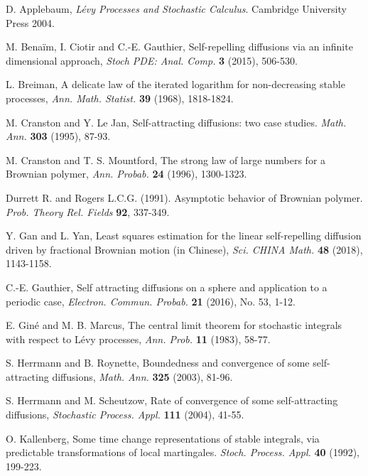 \documentclass[11pt]{amsart}
\theoremstyle{plain}
\numberwithin{equation}{section}
\begin{document}
\begin{thebibliography}{0}

  D. Applebaum, {\it L\'evy Processes and Stochastic Calculus}. Cambridge University Press 2004.
  
  M. Bena\"im, I. Ciotir and C.-E. Gauthier, Self-repelling diffusions via an infinite dimensional approach, {\em Stoch PDE: Anal. Comp.} {\bf 3} (2015), 506-530.
  
  L. Breiman, A delicate law of the iterated logarithm for non-decreasing stable processes, {\it Ann. Math. Statist.} {\bf 39} (1968), 1818-1824.
  
  M. Cranston and Y. Le Jan, Self-attracting diffusions: two case studies. {\it Math. Ann.} {\bf 303} (1995), 87-93.
  
  M. Cranston and T. S. Mountford, The strong law of large numbers for a Brownian polymer, {\it Ann. Probab.} {\bf 24} (1996), 1300-1323.
  
  Durrett R. and Rogers L.C.G. (1991).  Asymptotic behavior of Brownian polymer. {\it Prob. Theory Rel. Fields} {\bf 92}, 337-349.
  
  Y. Gan and L. Yan, Least squares estimation for the linear self-repelling diffusion driven by fractional Brownian motion (in Chinese), {\em Sci. CHINA Math.} {\bf 48} (2018), 1143-1158.
  
  C.-E. Gauthier, Self attracting diffusions on a sphere and application to a periodic case, {\em Electron. Commun. Probab.} {\bf 21} (2016), No. 53, 1-12.
  
  E. Gin\'e and M. B. Marcus, The central limit theorem for stochastic integrals with respect to L\'evy processes, {\it Ann. Prob.} {\bf 11} (1983), 58-77.
  
  S. Herrmann and B. Roynette, Boundedness and convergence of some self-attracting diffusions, {\it Math. Ann.} {\bf 325} (2003), 81-96.
  
  S. Herrmann and M. Scheutzow, Rate of convergence of some self-attracting diffusions, {\it Stochastic Process. Appl.} {\bf 111} (2004), 41-55.
  
  O. Kallenberg, Some time change representations of stable integrals, via predictable transformations of local martingales. {\em Stoch. Process. Appl.} {\bf 40} (1992), 199-223.
  

\end{thebibliography}
\end{document}
